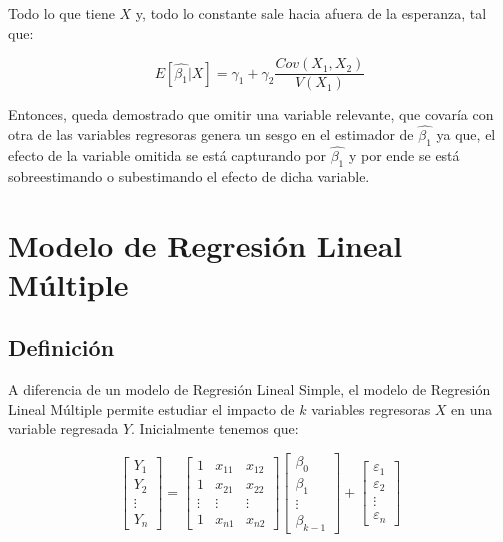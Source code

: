 \documentclass[
]{book}
\begin{document}
Todo lo que tiene \(X\) y, todo lo constante sale hacia afuera de la esperanza, tal que:

\[
E[\widehat{\beta_1}|X] = \gamma_1 + \gamma_2\frac{Cov(X_1,X_2)}{V(X_1)}
\]

Entonces, queda demostrado que omitir una variable relevante, que covaría con otra de las variables regresoras genera un sesgo en el estimador de \(\widehat{\beta_1}\) ya que, el efecto de la variable omitida se está capturando por \(\widehat{\beta_1}\) y por ende se está sobreestimando o subestimando el efecto de dicha variable.

\chapter{Modelo de Regresión Lineal Múltiple}\label{modelo-de-regresiuxf3n-lineal-muxfaltiple}

\section{Definición}\label{definiciuxf3n-1}

A diferencia de un modelo de Regresión Lineal Simple, el modelo de Regresión Lineal Múltiple permite estudiar el impacto de \(k\) variables regresoras \(X\) en una variable regresada \(Y\). Inicialmente tenemos que:

\[
\begin{bmatrix}
    Y_1 \\
    Y_2 \\
    \vdots \\
    Y_n
\end{bmatrix}
=
\begin{bmatrix}
    1 & x_{11} & x_{12} \\
    1 & x_{21} & x_{22} \\
    \vdots & \vdots & \vdots \\
    1 & x_{n1} & x_{n2}
\end{bmatrix}
\begin{bmatrix}
    \beta_0 \\
    \beta_1 \\
    \vdots \\
    \beta_{k-1}
\end{bmatrix}
+
\begin{bmatrix}
    \varepsilon_1 \\
    \varepsilon_2 \\
    \vdots \\
    \varepsilon_n
\end{bmatrix}
\]
\end{document}
